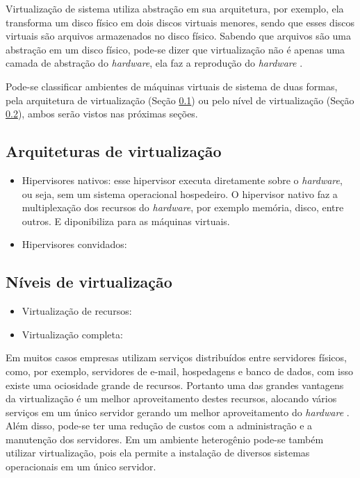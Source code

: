 Virtualização de sistema utiliza abstração em sua arquitetura, por exemplo, ela transforma um disco físico em dois discos 
virtuais menores, sendo que esses discos virtuais são arquivos armazenados no disco físico. Sabendo que arquivos são uma abstração
em um disco físico, pode-se dizer que virtualização não é apenas uma camada de abstração do \textit{hardware}, ela faz a reprodução 
do \textit{hardware} \cite{smithenair2005}.

Pode-se classificar ambientes de máquinas virtuais de sistema de duas formas, pela arquitetura de virtualização 
(Seção \ref{section:virtarq}) ou pelo nível de virtualização (Seção \ref{section:virtniv}), ambos serão vistos nas próximas seções.

\subsection{Arquiteturas de virtualização}
\label{section:virtarq}

\begin{itemize}
 \item Hipervisores nativos: esse hipervisor executa diretamente sobre o \textit{hardware}, ou seja, sem um sistema operacional
 hospedeiro. O hipervisor nativo faz a multiplexação dos recursos do \textit{hardware}, por exemplo memória, disco, entre outros.
 E diponibiliza para as máquinas virtuais.
 \item Hipervisores convidados: 
\end{itemize}

\subsection{Níveis de virtualização}
\label{section:virtniv}

\begin{itemize}
 \item Virtualização de recursos: 
 \item Virtualização completa: 
\end{itemize}



Em muitos casos empresas utilizam serviços distribuídos entre servidores físicos, como, por exemplo, servidores de e-mail, hospedagens e 
banco de dados, com isso existe uma ociosidade grande de recursos. Portanto uma das grandes vantagens da virtualização é um melhor 
aproveitamento destes recursos, alocando vários serviços em um único servidor gerando um melhor aproveitamento do \textit{hardware} 
\cite{moreira2006}. Além disso, pode-se ter uma redução de custos com a administração e a manutenção dos servidores. Em um ambiente 
heterogênio pode-se também utilizar virtualização, pois ela permite a instalação de diversos sistemas operacionais em um único servidor.

